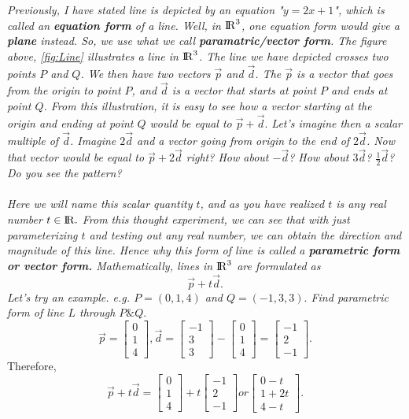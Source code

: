 \documentclass[addpoints]{exam}
\begin{document}
\textit{
Previously, I have stated line is depicted by an equation "$y=2x+1$", which is called an \textbf{equation form} of a line. Well, in ${\rm I\!R}^3$, one equation form would give a \textbf{plane} instead. So, we use what we call \textbf{paramatric/vector form}. The figure above, \ref{fig:Line} illustrates a line in ${\rm I\!R}^3$. The line we have depicted crosses two points $P$ and $Q$. We then have two vectors $\vec{p}$ and $\vec{d}$. The $\vec{p}$ is a vector that goes from the origin to point $P$, and $\vec{d}$ is a vector that starts at point $P$ and ends at point $Q$. From this illustration, it is easy to see how a vector starting at the origin and ending at point $Q$ would be equal to $\vec{p}+\vec{d}.$ Let's imagine then a scalar multiple of $\vec{d}$. Imagine $2\vec{d}$ and a vector going from origin to the end of $2\vec{d}$. Now that vector would be equal to $\vec{p}+2\vec{d}$ right? How about $-\vec{d}$? How about $3\vec{d}$? $\frac{1}{2}\vec{d}$? Do you see the pattern? \\\\
Here we will name this scalar quantity $t$, and as you have realized $t$ is any real number $t\in{\rm I\!R}.$ From this thought experiment, we can see that with just parameterizing $t$ and testing out any real number, we can obtain the direction and magnitude of this line. Hence why this form of line is called a \textbf{parametric form or vector form.} Mathematically, lines in ${\rm I\!R}^3$ are formulated as \[
\vec{p}+t\vec{d}.
\]
}
\textit{
Let's try an example. e.g. $P=(0,1,4)$ and $Q=(-1,3,3).$ Find parametric form of line $L$ through $P\&Q.$}
\[
\vec{p}=\begin{bmatrix}
    0\\1\\4
\end{bmatrix}, \vec{d}=\begin{bmatrix}
    -1\\3\\3
\end{bmatrix}-\begin{bmatrix}
    0\\1\\4
\end{bmatrix}=\begin{bmatrix}
    -1\\2\\-1
\end{bmatrix}.
\] Therefore, \[
\vec{p}+t\vec{d}=\begin{bmatrix}
    0\\1\\4
\end{bmatrix}+t\begin{bmatrix}
    -1\\2\\-1
\end{bmatrix} or \begin{bmatrix}
    0-t\\1+2t\\4-t
\end{bmatrix}.
\]
\end{document}
